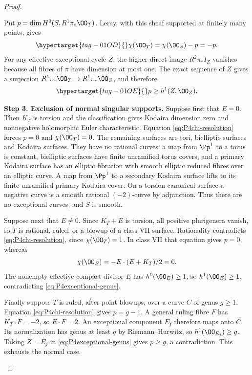 \begin{proof}
\begin{enumerate}[label={$\langle1\rangle$\arabic*.},leftmargin=*]
Put $p=\dim H^0(S,R^1\pi_*\OO_T)$. Leray, with this sheaf
supported at finitely many points, gives
\begin{equation}\hypertarget{tag-01OD}{}\label{eq:P4chi-resolution}
 \chi(\OO_T)=\chi(\OO_S)-p=-p.
\end{equation}
For any effective exceptional cycle $Z$, the higher direct image
$R^2\pi_*I_Z$ vanishes because all fibres of $\pi$ have dimension
at most one. The exact sequence of $Z$ gives a surjection
$R^1\pi_*\OO_T\to R^1\pi_*\OO_Z$, and therefore
\begin{equation}\hypertarget{tag-01OE}{}\label{eq:P4exceptional-genus}
 p\ge h^1(Z,\OO_Z).
\end{equation}

\noindent\textbf{Step 3. Exclusion of normal singular supports.}
Suppose first that $E=0$. Then $K_T$ is torsion and the
classification gives Kodaira dimension zero and nonnegative
holomorphic Euler characteristic. Equation
\eqref{eq:P4chi-resolution} forces $p=0$ and $\chi(\OO_T)=0$.
The remaining surfaces are tori, bielliptic surfaces and Kodaira
surfaces. They have no rational curves: a map from $\Pp^1$ to
a torus is constant, bielliptic surfaces have finite unramified
torus covers, and a primary Kodaira surface has an elliptic
fibration with smooth elliptic reduced fibres over an elliptic
curve. A map from $\Pp^1$ to a secondary Kodaira surface lifts
to its finite unramified primary Kodaira cover. On a torsion
canonical surface a negative curve is a smooth rational
$(-2)$-curve by adjunction. Thus there are no exceptional
curves, and $S$ is smooth.

Suppose next that $E\ne0$. Since $K_T+E$ is torsion, all
positive plurigenera vanish, so $T$ is rational, ruled, or a
blowup of a class-VII surface. Rationality contradicts
\eqref{eq:P4chi-resolution}, since $\chi(\OO_T)=1$. In class
VII that equation gives $p=0$, whereas
\[
 \chi(\OO_E)=-E\cdot(E+K_T)/2=0.
\]
The nonempty effective compact divisor $E$ has $h^0(\OO_E)\ge1$,
so $h^1(\OO_E)\ge1$, contradicting
\eqref{eq:P4exceptional-genus}.

Finally suppose $T$ is ruled, after point blowups, over a curve
$C$ of genus $g\ge1$. Equation \eqref{eq:P4chi-resolution}
gives $p=g-1$. A general ruling fibre $F$ has $K_T\cdot F=-2$,
so $E\cdot F=2$. An exceptional component $E_j$ therefore
maps onto $C$. Its normalization has genus at least $g$ by
Riemann--Hurwitz, so $h^1(\OO_{E_j})\ge g$. Taking $Z=E_j$
in \eqref{eq:P4exceptional-genus} gives $p\ge g$, a contradiction.
This exhausts the normal case.


\end{enumerate}
\end{proof}
